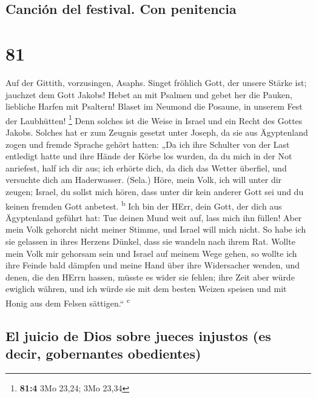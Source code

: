 \hypertarget{canciuxf3n-del-festival.-con-penitencia}{%
\subsection{Canción del festival. Con
penitencia}\label{canciuxf3n-del-festival.-con-penitencia}}

\hypertarget{section-80}{%
\section{81}\label{section-80}}

 Auf der Gittith, vorzusingen, Asaphs. 
Singet fröhlich Gott, der unsere Stärke ist; jauchzet dem Gott Jakobs!
 Hebet an mit Psalmen und gebet her die Pauken, liebliche
Harfen mit Psaltern!  Blaset im Neumond die Posaune, in
unserem Fest der Laubhütten! \footnote{\textbf{81:4} 3Mo 23,24; 3Mo
  23,34}  Denn solches ist die Weise in Israel und ein
Recht des Gottes Jakobs.  Solches hat er zum Zeugnis
gesetzt unter Joseph, da sie aus Ägyptenland zogen und fremde Sprache
gehört hatten:  „Da ich ihre Schulter von der Last
entledigt hatte und ihre Hände der Körbe los wurden,  da
du mich in der Not anriefest, half ich dir aus; ich erhörte dich, da
dich das Wetter überfiel, und versuchte dich am Haderwasser. (Sela.)
 Höre, mein Volk, ich will unter dir zeugen; Israel, du
sollst mich hören,  dass unter dir kein anderer Gott sei
und du keinen fremden Gott anbetest. \textsuperscript{b} 
Ich bin der HErr, dein Gott, der dich aus Ägyptenland geführt hat: Tue
deinen Mund weit auf, lass mich ihn füllen!  Aber mein
Volk gehorcht nicht meiner Stimme, und Israel will mich nicht.
 So habe ich sie gelassen in ihres Herzens Dünkel, dass
sie wandeln nach ihrem Rat.  Wollte mein Volk mir
gehorsam sein und Israel auf meinem Wege gehen,  so
wollte ich ihre Feinde bald dämpfen und meine Hand über ihre Widersacher
wenden,  und denen, die den HErrn hassen, müsste es wider
sie fehlen; ihre Zeit aber würde ewiglich währen,  und
ich würde sie mit dem besten Weizen speisen und mit Honig aus dem Felsen
sättigen.`` \textsuperscript{c}

\hypertarget{el-juicio-de-dios-sobre-jueces-injustos-es-decir-gobernantes-obedientes}{%
\subsection{El juicio de Dios sobre jueces injustos (es decir,
gobernantes
obedientes)}\label{el-juicio-de-dios-sobre-jueces-injustos-es-decir-gobernantes-obedientes}}


